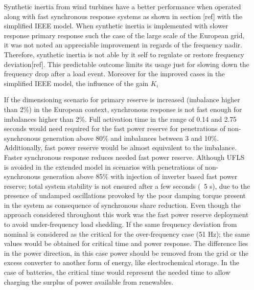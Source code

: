 Synthetic inertia from wind turbines have a better performance when operated along with fast synchronous response systems as shown in section [ref] with the simplified IEEE model. When synthetic inertia is implemented with slower response primary response such the case of the large scale of the European grid, it was not noted an appreciable improvement in regards of the frequency nadir. Therefore, synthetic inertia is not able by it self to regulate or restore frequency deviation[ref]. This predictable outcome limits its usage just for slowing down the frequency drop after a load event.  Moreover for the improved cases in the simplified IEEE model, the influence of the gain $ K_i$   

If the dimensioning scenario for primary reserve is increased (imbalance higher than 2\%) in the European context, synchronous response is not fast enough for imbalances higher than 2\%. Full activation time in the range of 0.14 and 2.75 seconds would need required for the fast power reserve for penetrations of non-synchronous generation above 80\% and imbalances between 3 and 10\%. Additionally, fast power reserve would be almost equivalent to the imbalance. Faster synchronous response reduces needed fast power reserve. Although UFLS is avoided in the extended model in scenarios with penetrations of non-synchronous generation above 85\% with injection of inverter based fast power reserve; total system stability is not ensured after a few seconds (~5 s), due to the presence of undamped oscillations provoked by the poor damping torque present in the system as consequence of synchronous share reduction. Even though the approach considered throughout this work was the fast power reserve deployment to avoid under-frequency load shedding. If the same frequency deviation from nominal is considered as the critical for the over-frequency case (51 Hz); the same values would be obtained for critical time and power response. The difference lies in the power direction, in this case power should be removed from the grid or the excess converter to another form of energy, like electrochemical storage. In the case of batteries, the critical time would represent the needed time to allow charging the surplus of power available from renewables.\\

